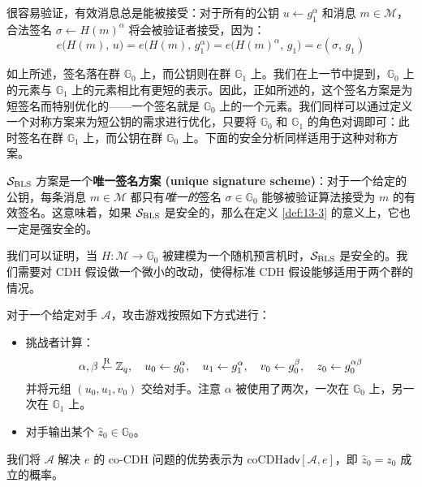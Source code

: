 很容易验证，有效消息总是能被接受：对于所有的公钥 $u\leftarrow g_1^\alpha$ 和消息 $m\in\mathcal{M}$，合法签名 $\sigma \leftarrow H(m)^\alpha$  将会被验证者接受，因为：
\[
e\big(H(m),\,u\big)=e\big(H(m),\,g_1^\alpha\big)=e\big(H(m)^\alpha,\,g_1\big)=e(\sigma,\,g_1)
\]

如上所述，签名落在群 $\mathbb{G}_0$ 上，而公钥则在群 $\mathbb{G}_1$ 上。我们在上一节中提到，$\mathbb{G}_0$ 上的元素与 $\mathbb{G}_1$ 上的元素相比有更短的表示。因此，正如所述的，这个签名方案是为短签名而特别优化的——一个签名就是 $\mathbb{G}_0$ 上的一个元素。我们同样可以通过定义一个对称方案来为短公钥的需求进行优化，只要将 $\mathbb{G}_0$ 和 $\mathbb{G}_1$ 的角色对调即可：此时签名在群 $\mathbb{G}_1$ 上，而公钥在群 $\mathbb{G}_0$ 上。下面的安全分析同样适用于这种对称方案。

\begin{snote}[唯一签名。]
$\mathcal{S}_{\rm BLS}$ 方案是一个\textbf{唯一签名方案 (unique signature scheme)}：对于一个给定的公钥，每条消息 $m\in\mathcal{M}$ 都只有\emph{唯一的}签名 $\sigma\in\mathbb{G}_0$ 能够被验证算法接受为 $m$ 的有效签名。这意味着，如果 $\mathcal{S}_{\rm BLS}$ 是安全的，那么在定义 \ref{def:13-3} 的意义上，它也一定是强安全的。
\end{snote}

\begin{snote}[安全性。]
我们可以证明，当 $H:\mathcal{M}\to\mathbb{G}_0$ 被建模为一个随机预言机时，$\mathcal{S}_{\rm BLS}$ 是安全的。我们需要对 CDH 假设做一个微小的改动，使得标准 CDH 假设能够适用于两个群的情况。
\end{snote}

\begin{game}[co-CDH]\label{game:15-1}
对于一个给定对手 $\mathcal{A}$，攻击游戏按照如下方式进行：
\begin{itemize}
	\item 挑战者计算：
	\[
		\alpha,\beta \overset{\rm R}\leftarrow \mathbb{Z}_q,\quad
    	u_0 \leftarrow g_0^\alpha,\quad
    	u_1 \leftarrow g_1^\alpha,\quad
    	v_0 \leftarrow g_0^\beta,\quad
    	z_0 \leftarrow g_0^{\alpha\beta}
	\]
	并将元组 $(u_0, u_1, v_0)$ 交给对手。注意 $\alpha$ 被使用了两次，一次在 $\mathbb{G}_0$ 上，另一次在 $\mathbb{G}_1$ 上。
	\item 对手输出某个 $\hat{z}_0 \in \mathbb{G}_0$。
\end{itemize}
我们将 $\mathcal{A}$ 解决 $e$ 的 co-CDH 问题的优势表示为 $\mathrm{coCDH}\mathsf{adv}[\mathcal{A},e]$，即 $\hat{z}_0 = z_0$ 成立的概率。
\end{game}

